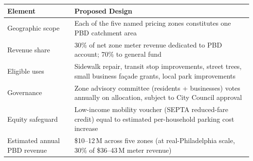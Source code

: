 \begin{tabularx}{\linewidth}{lX}
\toprule
\textbf{Element} & \textbf{Proposed Design} \\
\midrule
Geographic scope   & Each of the five named pricing zones constitutes one PBD catchment area \\
Revenue share      & 30\% of net zone meter revenue dedicated to PBD account; 70\% to general fund \\
Eligible uses      & Sidewalk repair, transit stop improvements, street trees, small business fa\c{c}ade grants, local park improvements \\
Governance         & Zone advisory committee (residents + businesses) votes annually on allocation, subject to City Council approval \\
Equity safeguard   & Low-income mobility voucher (SEPTA reduced-fare credit) equal to estimated per-household parking cost increase \\
Estimated annual PBD revenue & \$10--12\,M across five zones (at real-Philadelphia scale, 30\% of \$36--43\,M meter revenue) \\
\bottomrule
\end{tabularx}
